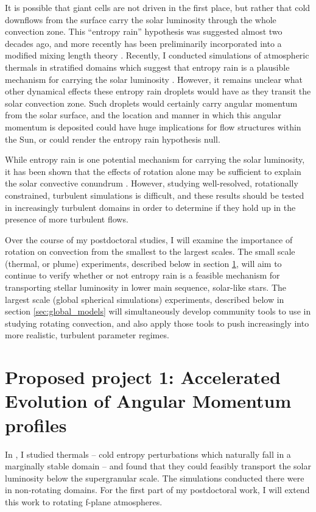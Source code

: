 \documentclass[aasms,12pt]{article}
\begin{document}
It is possible that giant cells are not driven in the first place, but rather that cold downflows from the surface carry the solar luminosity through the whole convection zone.
This ``entropy rain'' hypothesis was suggested almost two decades ago, and more recently has been preliminarily incorporated into a modified mixing length theory \cite{brandenburg2016}.
Recently, I conducted simulations of atmospheric thermals in stratified domains which suggest that entropy rain is a plausible mechanism for carrying the solar luminosity \cite{andersLB2019}.
However, it remains unclear what other dynamical effects these entropy rain droplets would have as they transit the solar convection zone.
Such droplets would certainly carry angular momentum from the solar surface, and the location and manner in which this angular momentum is deposited could have huge implications for flow structures within the Sun, or could render the entropy rain hypothesis null.

While entropy rain is one potential mechanism for carrying the solar luminosity, it has been shown that the effects of rotation alone may be sufficient to explain the solar convective conundrum \citep{featherstone&hindman2016}.
However, studying well-resolved, rotationally constrained, turbulent simulations is difficult, and these results should be tested in increasingly turbulent domains in order to determine if they hold up in the presence of more turbulent flows.

Over the course of my postdoctoral studies, I will examine the importance of rotation on convection from the smallest to the largest scales.
The small scale (thermal, or plume) experiments, described below in section \ref{sct:thermals}, will aim to continue to verify whether or not entropy rain is a feasible mechanism for transporting stellar luminosity in lower main sequence, solar-like stars.
The largest scale (global spherical simulations) experiments, described below in section \ref{sec:global_models} will simultaneously develop community tools to use in studying rotating convection, and also apply those tools to push increasingly into more realistic, turbulent parameter regimes.


\section{Proposed project 1: Accelerated Evolution of Angular Momentum profiles}
\label{sct:thermals}
In \citet{andersLB2019}, I studied thermals -- cold entropy perturbations which naturally fall in a marginally stable domain -- and found that they could feasibly transport the solar luminosity below the supergranular scale.
The simulations conducted there were in non-rotating domains.
For the first part of my postdoctoral work, I will extend this work to rotating f-plane atmospheres.
\end{document}
